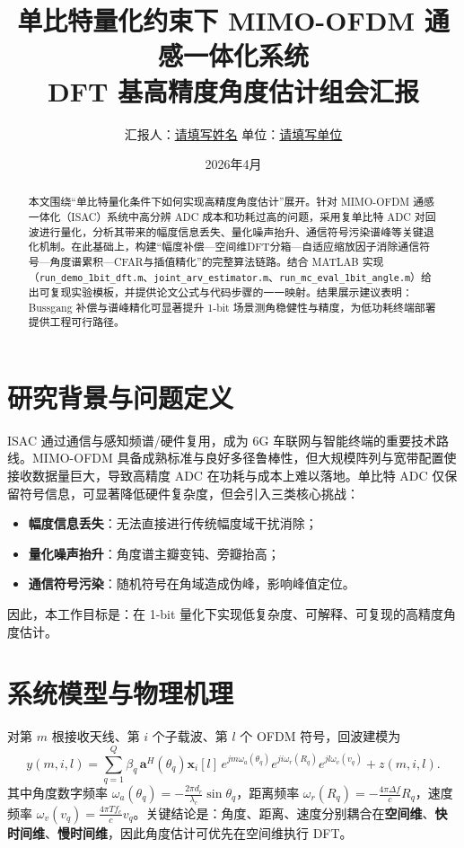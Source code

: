 \documentclass[12pt,a4paper]{ctexart}
\title{单比特量化约束下 MIMO-OFDM 通感一体化系统\\DFT 基高精度角度估计组会汇报}
\author{汇报人：\underline{请填写姓名} \quad 单位：\underline{请填写单位}}
\date{2026年4月}
\begin{document}
\maketitle

\begin{abstract}
本文围绕“单比特量化条件下如何实现高精度角度估计”展开。针对 MIMO-OFDM 通感一体化（ISAC）系统中高分辨 ADC 成本和功耗过高的问题，采用复单比特 ADC 对回波进行量化，分析其带来的幅度信息丢失、量化噪声抬升、通信符号污染谱峰等关键退化机制。在此基础上，构建“幅度补偿—空间维DFT分箱—自适应缩放因子消除通信符号—角度谱累积—CFAR与插值精化”的完整算法链路。结合 MATLAB 实现（\texttt{run\_demo\_1bit\_dft.m}、\texttt{joint\_arv\_estimator.m}、\texttt{run\_mc\_eval\_1bit\_angle.m}）给出可复现实验模板，并提供论文公式与代码步骤的一一映射。结果展示建议表明：Bussgang 补偿与谱峰精化可显著提升 1-bit 场景测角稳健性与精度，为低功耗终端部署提供工程可行路径。
\end{abstract}

\section{研究背景与问题定义}
ISAC 通过通信与感知频谱/硬件复用，成为 6G 车联网与智能终端的重要技术路线。MIMO-OFDM 具备成熟标准与良好多径鲁棒性，但大规模阵列与宽带配置使接收数据量巨大，导致高精度 ADC 在功耗与成本上难以落地。单比特 ADC 仅保留符号信息，可显著降低硬件复杂度，但会引入三类核心挑战：
\begin{itemize}
  \item \textbf{幅度信息丢失}：无法直接进行传统幅度域干扰消除；
  \item \textbf{量化噪声抬升}：角度谱主瓣变钝、旁瓣抬高；
  \item \textbf{通信符号污染}：随机符号在角域造成伪峰，影响峰值定位。
\end{itemize}
因此，本工作目标是：在 1-bit 量化下实现低复杂度、可解释、可复现的高精度角度估计。

\section{系统模型与物理机理}
对第 $m$ 根接收天线、第 $i$ 个子载波、第 $l$ 个 OFDM 符号，回波建模为
\begin{equation}
  y(m,i,l)=\sum_{q=1}^{Q}\beta_q\,\mathbf{a}^H(\theta_q)\mathbf{x}_i[l]\,e^{j m\omega_a(\theta_q)}e^{j i\omega_r(R_q)}e^{j l\omega_v(v_q)}+z(m,i,l).
\end{equation}
其中角度数字频率 $\omega_a(\theta_q)=-\frac{2\pi d_r}{\lambda_c}\sin\theta_q$，距离频率 $\omega_r(R_q)=-\frac{4\pi\Delta f}{c}R_q$，速度频率 $\omega_v(v_q)=\frac{4\pi T f_c}{c}v_q$。关键结论是：角度、距离、速度分别耦合在\textbf{空间维}、\textbf{快时间维}、\textbf{慢时间维}，因此角度估计可优先在空间维执行 DFT。
\end{document}
